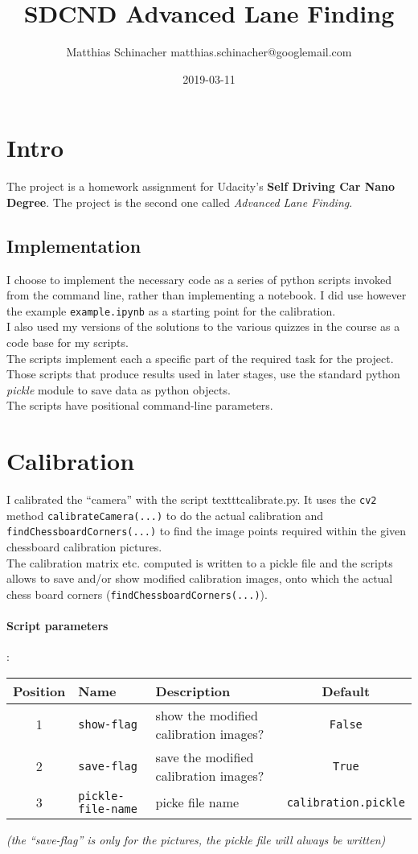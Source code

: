\documentclass[a4paper]{article}
\title{SDCND Advanced Lane Finding}
\date{2019-03-11}
\author{Matthias Schinacher matthias.schinacher@googlemail.com}
\begin{document}
\maketitle
\tableofcontents
\newpage

\section{Intro}
The project is a homework assignment for Udacity's \textbf{Self Driving Car Nano Degree}.
The project is the second one called \textit{Advanced Lane Finding}.

\subsection{Implementation}
I choose to implement the necessary code as a series of python scripts invoked from
the command line, rather than implementing a notebook. I did use however the
example \texttt{example.ipynb} as a starting point for the calibration.
\\
I also used my versions of the solutions to the various quizzes in the course
as a code base for my scripts.
\\
The scripts implement each a specific part of the required task for the
project. Those scripts that produce results used in later stages, use the
standard python \textit{pickle} module to save data as python objects.
\\
The scripts have positional command-line parameters.

\section{Calibration}
I calibrated the \enquote{camera} with the script texttt{calibrate.py}.
It uses the \texttt{cv2} method \texttt{calibrateCamera(...)} to do the actual
calibration and \texttt{findChessboardCorners(...)} to find the image points
required within the given chessboard calibration pictures.
\\
The calibration matrix etc. computed is written to a pickle file and the
scripts allows to save and/or show modified calibration images, onto which
the actual chess board corners (\texttt{findChessboardCorners(...)}).

\paragraph{Script parameters}
:\\
\small
\begin{tabular}{ |c|l|l|c| }
  \hline
Position & Name & Description & Default \\
  \hline
1 & \texttt{show-flag} & show the modified calibration images? & \texttt{False} \\
2 & \texttt{save-flag} & save the modified calibration images? & \texttt{True} \\
3 & \texttt{pickle-file-name} & picke file name & \texttt{calibration.pickle} \\
\hline
\end{tabular}
\normalsize
\textit{(the \enquote{save-flag} is only for the pictures, the pickle file will always be written)}
\end{document}
